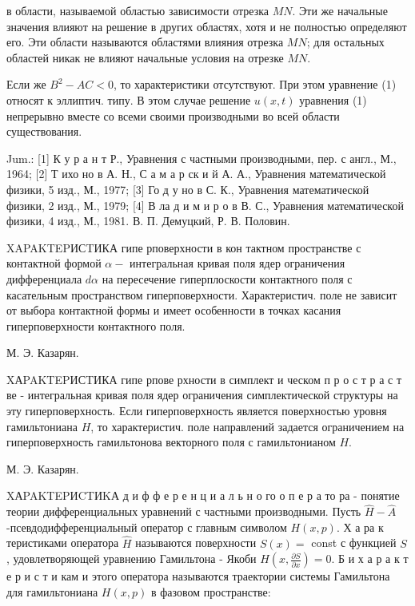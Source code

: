 \documentclass[10pt]{article}
\begin{document}
в области, называемой областью зависимости отрезка $M N$. Эти же начальные значения влияют на решение в других областях, хотя и не полностью определяют его. Эти области называются областями влияния отрезка $M N$; для остальных областей никак не влияют начальные условия на отрезке $M N$.



Если же $B^{2}-A C<0$, то характеристики отсутствуют. При этом уравнение (1) относят к эллиптич. типу. В этом случае решение $u(x, t)$ уравнения (1) непрерывно вместе со всеми своими производными во всей области существования.



Jum.: [1] К у р а н т Р., Уравнения с частными производными, пер. с англ., М., 1964; [2] Т ихо но в А. Н., С а м а р ск и й А. А., Уравнения математической физики, 5 изд., М., 1977; [3] Го д у но в С. К., Уравнения математической физики, 2 изд., М., 1979; [4] В ла д и м и р о в В. С., Уравнения математической физики, 4 изд., М., 1981. В. П. Демуцкий, Р. В. Половин.



XAPAKTEPИСTИКА гипе рповерхности в кон тактном пространстве с контактной формой $\alpha-$ интегральная кривая поля ядер ограничения дифференциала $d \alpha$ на пересечение гиперплоскости контактного поля с касательным пространством гиперповерхности. Характеристич. поле не зависит от выбора контактной формы и имеет особенности в точках касания гиперповерхности контактного поля.



М. Э. Казарян.



XАPAKTEPИСTИКА гипе рпове рхности в симплект и ческом п р о с т р а с т ве - интегральная кривая поля ядер ограничения симплектической структуры на эту гиперповерхность. Если гиперповерхность является поверхностью уровня гамильтониана $H$, то характеристич. поле направлений задается ограничением на гиперповерхность гамильтонова векторного поля с гамильтонианом $H$.



М. Э. Казарян.



XАPAKTEPИCTИKА д и ф ф е р е н ц и а л ь н о го о п е р а то ра - понятие теории дифференциальных уравнений с частными производными. Пусть $\hat{H}-\hat{A}$-псевдодифференциальный оператор с главным символом $H(x, p)$. Х а ра к теристиками оператора $\hat{H}$ называются поверхности $S(x)=$ const с функцией $S$, удовлетворяющей уравнению Гамильтона - Якоби $H\left(x, \frac{\partial S}{\partial x}\right)=0$. Б и х а р а к т е р и с т и кам и этого оператора называются траектории системы Гамильтона для гамильтониана $H(x, p)$ в фазовом пространстве:
\end{document}

